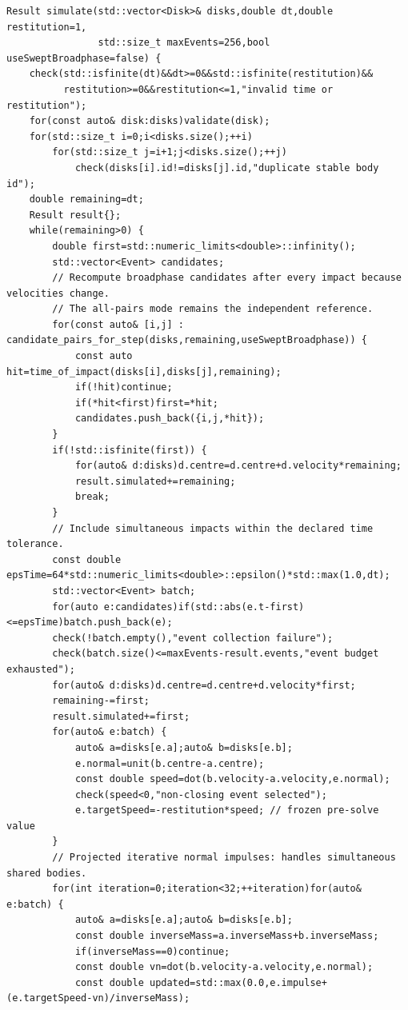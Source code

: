 \begin{verbatim}
Result simulate(std::vector<Disk>& disks,double dt,double restitution=1,
                std::size_t maxEvents=256,bool useSweptBroadphase=false) {
    check(std::isfinite(dt)&&dt>=0&&std::isfinite(restitution)&&
          restitution>=0&&restitution<=1,"invalid time or restitution");
    for(const auto& disk:disks)validate(disk);
    for(std::size_t i=0;i<disks.size();++i)
        for(std::size_t j=i+1;j<disks.size();++j)
            check(disks[i].id!=disks[j].id,"duplicate stable body id");
    double remaining=dt;
    Result result{};
    while(remaining>0) {
        double first=std::numeric_limits<double>::infinity();
        std::vector<Event> candidates;
        // Recompute broadphase candidates after every impact because velocities change.
        // The all-pairs mode remains the independent reference.
        for(const auto& [i,j] : candidate_pairs_for_step(disks,remaining,useSweptBroadphase)) {
            const auto hit=time_of_impact(disks[i],disks[j],remaining);
            if(!hit)continue;
            if(*hit<first)first=*hit;
            candidates.push_back({i,j,*hit});
        }
        if(!std::isfinite(first)) {
            for(auto& d:disks)d.centre=d.centre+d.velocity*remaining;
            result.simulated+=remaining;
            break;
        }
        // Include simultaneous impacts within the declared time tolerance.
        const double epsTime=64*std::numeric_limits<double>::epsilon()*std::max(1.0,dt);
        std::vector<Event> batch;
        for(auto e:candidates)if(std::abs(e.t-first)<=epsTime)batch.push_back(e);
        check(!batch.empty(),"event collection failure");
        check(batch.size()<=maxEvents-result.events,"event budget exhausted");
        for(auto& d:disks)d.centre=d.centre+d.velocity*first;
        remaining-=first;
        result.simulated+=first;
        for(auto& e:batch) {
            auto& a=disks[e.a];auto& b=disks[e.b];
            e.normal=unit(b.centre-a.centre);
            const double speed=dot(b.velocity-a.velocity,e.normal);
            check(speed<0,"non-closing event selected");
            e.targetSpeed=-restitution*speed; // frozen pre-solve value
        }
        // Projected iterative normal impulses: handles simultaneous shared bodies.
        for(int iteration=0;iteration<32;++iteration)for(auto& e:batch) {
            auto& a=disks[e.a];auto& b=disks[e.b];
            const double inverseMass=a.inverseMass+b.inverseMass;
            if(inverseMass==0)continue;
            const double vn=dot(b.velocity-a.velocity,e.normal);
            const double updated=std::max(0.0,e.impulse+(e.targetSpeed-vn)/inverseMass);

\end{verbatim}
